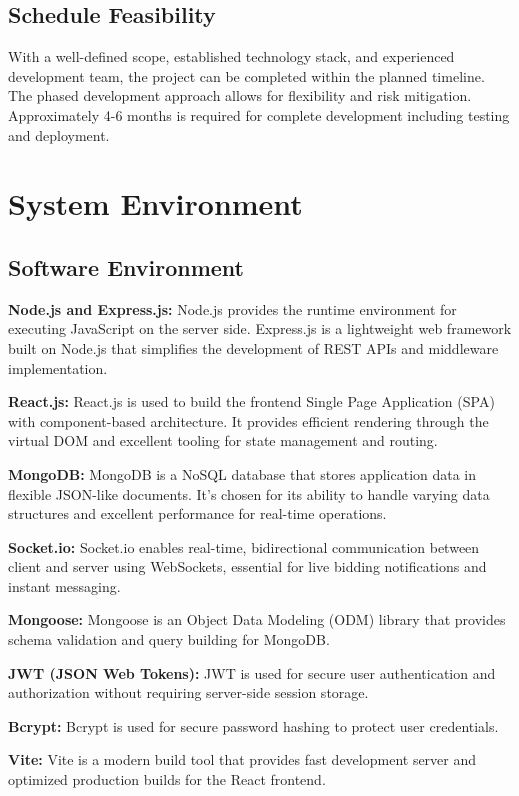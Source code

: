 \subsection{Schedule Feasibility}
With a well-defined scope, established technology stack, and experienced development team, the project can be completed within the planned timeline. The phased development approach allows for flexibility and risk mitigation. Approximately 4-6 months is required for complete development including testing and deployment.

\section{System Environment}

\subsection{Software Environment}

\textbf{Node.js and Express.js:}
Node.js provides the runtime environment for executing JavaScript on the server side. Express.js is a lightweight web framework built on Node.js that simplifies the development of REST APIs and middleware implementation.

\textbf{React.js:}
React.js is used to build the frontend Single Page Application (SPA) with component-based architecture. It provides efficient rendering through the virtual DOM and excellent tooling for state management and routing.

\textbf{MongoDB:}
MongoDB is a NoSQL database that stores application data in flexible JSON-like documents. It's chosen for its ability to handle varying data structures and excellent performance for real-time operations.

\textbf{Socket.io:}
Socket.io enables real-time, bidirectional communication between client and server using WebSockets, essential for live bidding notifications and instant messaging.

\textbf{Mongoose:}
Mongoose is an Object Data Modeling (ODM) library that provides schema validation and query building for MongoDB.

\textbf{JWT (JSON Web Tokens):}
JWT is used for secure user authentication and authorization without requiring server-side session storage.

\textbf{Bcrypt:}
Bcrypt is used for secure password hashing to protect user credentials.

\textbf{Vite:}
Vite is a modern build tool that provides fast development server and optimized production builds for the React frontend.

